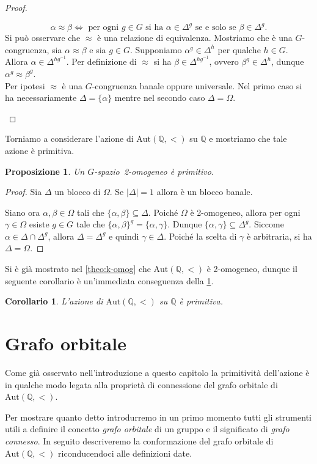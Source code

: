 \documentclass[12pt,a4paper,openright]{report}
\newcommand{\aut}{ \mathrm{Aut} ( \mathbb{Q},< ) } %
\newcommand{\Q}{\mathbb{Q}} %
\newcommand{\0}{\setminus\{0\}} %
\newcommand{\Gsp}{$G$-spazio~} %
\theoremstyle{definition}
\theoremstyle{plain}
\newtheorem{cor}[defn]{Corollario}
\newtheorem{prop}[defn]{Proposizione}
\begin{document}
\begin{proof}
\begin{itemize}
     \[\alpha \approx \beta \Leftrightarrow \mbox{ per ogni } g \in G \mbox{ si ha } \alpha \in \Delta^g \mbox{ se e solo se } \beta \in \Delta^g.\] 
     Si può osservare che $\approx$ è una relazione di equivalenza. Mostriamo che è una $G$-congruenza, sia $\alpha \approx \beta$ e sia $g \in G$. Supponiamo $\alpha^g \in \Delta^h$ per qualche $h \in G$. Allora $\alpha \in \Delta^{hg^{-1}}$. Per definizione di $\approx$ si ha $\beta \in \Delta^{hg^{-1}}$, ovvero $\beta^g \in \Delta^h$, dunque $\alpha^g \approx \beta^g$. \\
    Per ipotesi $\approx$ è una $G$-congruenza banale oppure universale. Nel primo caso si ha necessariamente $\Delta=\{\alpha\}$ mentre nel secondo caso $\Delta=\Omega$.
\end{itemize}
\end{proof}
Torniamo a considerare l'azione di $\aut$ su $\Q$ e mostriamo che tale azione è primitiva. 
\begin{prop}\label{prop:prim2omo}
Un \Gsp 2-omogeneo è primitivo.
\end{prop}
\begin{proof}
Sia $\Delta$ un blocco di $\Omega$. Se $|\Delta|=1$ allora è un blocco banale.

\noindent Siano ora $\alpha,\beta \in \Omega$ tali che $\{\alpha,\beta \} \subseteq \Delta$. Poiché $\Omega$ è 2-omogeneo, allora per ogni $\gamma \in \Omega$ esiste $g \in G$ tale che $\{ \alpha, \beta \}^g =\{\alpha,\gamma\}$. Dunque $\{\alpha,\gamma \} \subseteq \Delta^g$. Siccome $\alpha \in \Delta \cap \Delta^g$, allora $\Delta = \Delta^g$ e quindi $\gamma \in \Delta$. Poiché la scelta di $\gamma$ è arbitraria, si ha $\Delta=\Omega$.
\end{proof}
Si è già mostrato nel \cref{theo:k-omog} che ${\aut}$ è 2-omogeneo, dunque il seguente corollario è un'immediata conseguenza della \cref{prop:prim2omo}.
\begin{cor}
L'azione di $\aut$ su $\Q$ è primitiva.
\end{cor}

\section{Grafo orbitale}
Come già osservato nell'introduzione a questo capitolo la primitività dell'azione è in qualche modo legata alla proprietà di connessione del grafo orbitale di $\aut$.

Per mostrare quanto detto introdurremo in un primo momento tutti gli strumenti utili a definire il concetto \emph{grafo orbitale} di un gruppo e il significato di \emph{grafo connesso}. In seguito descriveremo la conformazione del grafo orbitale di $\aut$ riconducendoci alle definizioni date.
\end{document}
